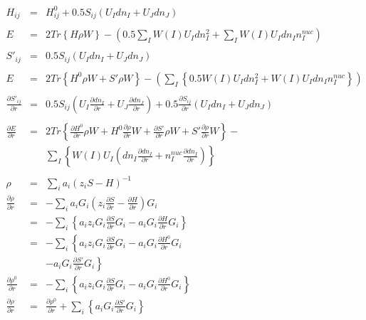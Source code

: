 \documentclass{article}
\begin{document}
\begin{eqnarray*}
H_{ij} & = & H^0_{ij} + 0.5 S_{ij} (U_I dn_I + U_J dn_J) \\
 \\
E & = & 2 Tr \left\{ H \rho W \right\} - ( 0.5 \sum_I W(I) U_I dn_I^2 + \sum_I W(I) U_I dn_I n^{nuc}_I) \\
 \\
S'_{ij} & = & 0.5 S_{ij} (U_I dn_I + U_J dn_J) \\
 \\
E & = & 2 Tr \left\{ H^0 \rho W + S' \rho W \right\} - ( \sum_I \left\{ 0.5 W(I) U_I dn_I^2 + W(I) U_I dn_I n^{nuc}_I \right\} ) \\
 \\
\frac{\partial S'_{ij}}{\partial r} & = & 0.5 S_{ij} (U_I \frac{\partial dn_I}{\partial r} + U_J \frac{\partial dn_J}{\partial r}) + 0.5 \frac{\partial S_{ij}}{\partial r} (U_I dn_I + U_J dn_J) \\
 \\
\frac{\partial E}{\partial r} & = & 2 Tr \left\{ \frac{\partial H^0}{\partial r} \rho W + H^0 \frac{\partial \rho}{\partial r} W + \frac{\partial S'}{\partial r} \rho W + S' \frac{\partial \rho}{\partial r} W \right\} - \\
&&        \sum_I \left\{ W(I) U_I ( dn_I \frac{\partial dn_I}{\partial r} + n^{nuc}_I \frac{\partial dn_I}{\partial r} ) \right\} \\
 \\
\rho & = & \sum_i a_i (z_i S - H)^{-1} \\
\frac{\partial \rho}{\partial r} & = & - \sum_i a_i G_i (z_i \frac{\partial S}{\partial r} - \frac{\partial H}{\partial r}) G_i \\
        & = & - \sum_i \left\{ a_i z_i G_i \frac{\partial S}{\partial r} G_i - a_i G_i \frac{\partial H}{\partial r} G_i \right\} \\
	& = & - \sum_i \left\{ a_i z_i G_i \frac{\partial S}{\partial r} G_i - a_i G_i \frac{\partial H^0}{\partial r} G_i \right.\\
&&		  \left. - a_i G_i \frac{\partial S'}{\partial r} G_i \right\} \\
\frac{\partial \rho^0}{\partial r} & = & - \sum_i \left\{ a_i z_i G_i \frac{\partial S}{\partial r} G_i - a_i G_i \frac{\partial H^0}{\partial r} G_i \right\} \\
\frac{\partial \rho}{\partial r} & = & \frac{\partial \rho^0}{\partial r} + \sum_i \left\{ a_i G_i \frac{\partial S'}{\partial r} G_i \right\} \\
 \\

\end{eqnarray*}
\end{document}

